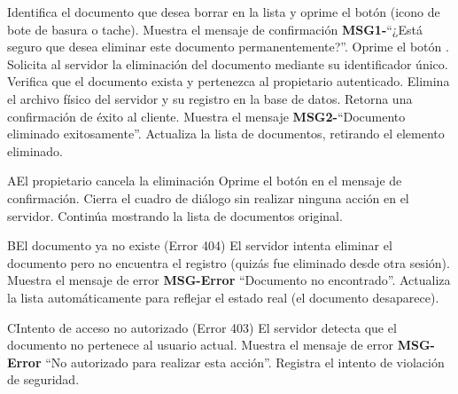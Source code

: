 \begin{UCtrayectoria}
    \UCpaso[\UCactor] Identifica el documento que desea borrar en la lista y oprime el botón  (icono de bote de basura o tache).
    \UCpaso Muestra el mensaje de confirmación {\bf MSG1-}``¿Está seguro que desea eliminar este documento permanentemente?''.
    \UCpaso[\UCactor] Oprime el botón .
    \UCpaso Solicita al servidor la eliminación del documento mediante su identificador único.
    \UCpaso Verifica que el documento exista y pertenezca al propietario autenticado.
    \UCpaso Elimina el archivo físico del servidor y su registro en la base de datos.
    \UCpaso Retorna una confirmación de éxito al cliente.
    \UCpaso Muestra el mensaje {\bf MSG2-}``Documento eliminado exitosamente''.
    \UCpaso Actualiza la lista de documentos, retirando el elemento eliminado.
\end{UCtrayectoria}


\begin{UCtrayectoriaA}{A}{El propietario cancela la eliminación}
    \UCpaso[\UCactor] Oprime el botón  en el mensaje de confirmación.
    \UCpaso Cierra el cuadro de diálogo sin realizar ninguna acción en el servidor.
    \UCpaso Continúa mostrando la lista de documentos original.
\end{UCtrayectoriaA}

\begin{UCtrayectoriaA}{B}{El documento ya no existe (Error 404)}
    \UCpaso El servidor intenta eliminar el documento pero no encuentra el registro (quizás fue eliminado desde otra sesión).
    \UCpaso Muestra el mensaje de error {\bf MSG-Error} ``Documento no encontrado''.
    \UCpaso Actualiza la lista automáticamente para reflejar el estado real (el documento desaparece).
\end{UCtrayectoriaA}

\begin{UCtrayectoriaA}{C}{Intento de acceso no autorizado (Error 403)}
    \UCpaso El servidor detecta que el documento no pertenece al usuario actual.
    \UCpaso Muestra el mensaje de error {\bf MSG-Error} ``No autorizado para realizar esta acción''.
    \UCpaso Registra el intento de violación de seguridad.
\end{UCtrayectoriaA}